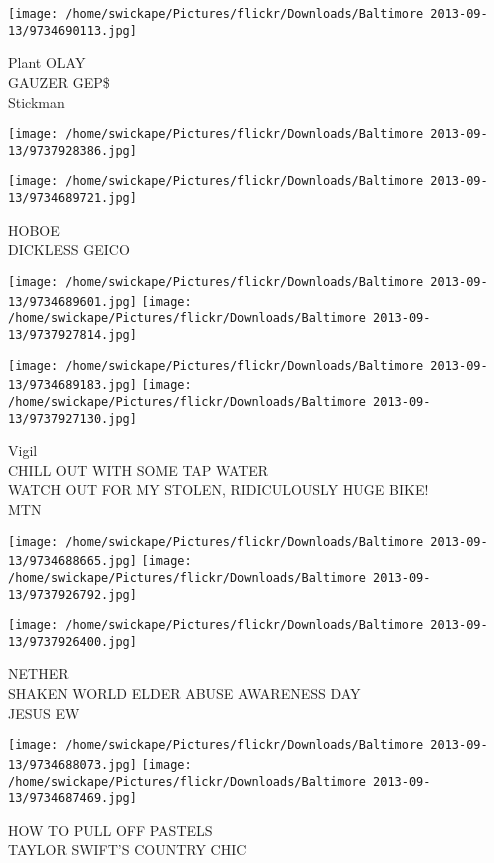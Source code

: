 \documentclass[10pt,letterpaper]{article}
\begin{document}
\texttt{[image: /home/swickape/Pictures/flickr/Downloads/Baltimore 2013-09-13/9734690113.jpg]}

Plant OLAY\\
GAUZER GEP\$\\
Stickman
\pagebreak

\texttt{[image: /home/swickape/Pictures/flickr/Downloads/Baltimore 2013-09-13/9737928386.jpg]}

\vspace{0.25in}
\texttt{[image: /home/swickape/Pictures/flickr/Downloads/Baltimore 2013-09-13/9734689721.jpg]}

HOBOE\\
DICKLESS GEICO
\pagebreak

\texttt{[image: /home/swickape/Pictures/flickr/Downloads/Baltimore 2013-09-13/9734689601.jpg]}
\texttt{[image: /home/swickape/Pictures/flickr/Downloads/Baltimore 2013-09-13/9737927814.jpg]}

\texttt{[image: /home/swickape/Pictures/flickr/Downloads/Baltimore 2013-09-13/9734689183.jpg]}
\texttt{[image: /home/swickape/Pictures/flickr/Downloads/Baltimore 2013-09-13/9737927130.jpg]}

Vigil\\
CHILL OUT WITH SOME TAP WATER\\
WATCH OUT FOR MY STOLEN, RIDICULOUSLY HUGE BIKE!\\
MTN
\pagebreak

\texttt{[image: /home/swickape/Pictures/flickr/Downloads/Baltimore 2013-09-13/9734688665.jpg]}
\texttt{[image: /home/swickape/Pictures/flickr/Downloads/Baltimore 2013-09-13/9737926792.jpg]}

\vspace{0.25in}
\texttt{[image: /home/swickape/Pictures/flickr/Downloads/Baltimore 2013-09-13/9737926400.jpg]}

NETHER\\
SHAKEN WORLD ELDER ABUSE AWARENESS DAY\\
JESUS EW
\pagebreak

\texttt{[image: /home/swickape/Pictures/flickr/Downloads/Baltimore 2013-09-13/9734688073.jpg]}
\texttt{[image: /home/swickape/Pictures/flickr/Downloads/Baltimore 2013-09-13/9734687469.jpg]}

HOW TO PULL OFF PASTELS\\
TAYLOR SWIFT'S COUNTRY CHIC
\pagebreak
\end{document}
